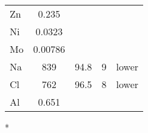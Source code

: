 \begin{table}
\begin{threeparttable}
\begin{tabularx}{\textwidth}{XcccX}
      Zn
      & \num{0.235}
      &
      &
      &
      \\

      Ni
      & \num{0.0323}
      &
      &
      &
      \\

      Mo
      & \num{0.00786}
      &
      &
      &
      \\

      Na
      & \num{839}
      & \num{94.8}
      & 9
      & lower
      \\

      Cl
      & \num{762}
      & \num{96.5}
      & 8
      & lower
      \\

      Al
      & \num{0.651}
      &
      &
      &
      \\

      \bottomrule

    \end{tabularx}
    \begin{tablenotes}
      \item[*]
    \end{tablenotes}
  \end{threeparttable}
\end{table}
